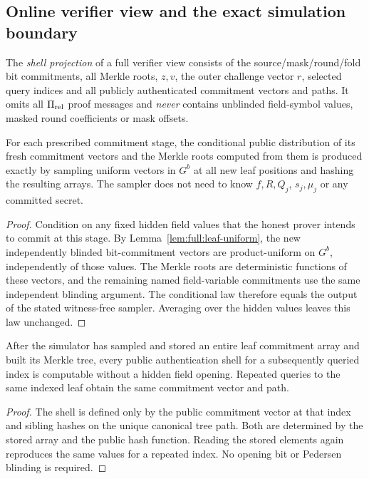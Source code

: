 \subsection{Online verifier view and the exact simulation boundary}\label{sec:full:online}

\begin{definition}\label{def:full:shell-view}
The \emph{shell projection} of a full
verifier view consists of the
source/mask/round/fold bit commitments,
all Merkle roots, $z,v$, the outer
challenge vector $r$, selected query
indices and all publicly authenticated
commitment vectors and paths.
It omits all $\Pi_{\rm rel}$ proof
messages and \emph{never} contains
unblinded field-symbol values,
masked round coefficients or
mask offsets.
\end{definition}

\begin{lemma}\label{lem:full:simulate-roots}
For each prescribed commitment stage,
the conditional public distribution
of its fresh commitment vectors
and the Merkle roots computed from
them is produced exactly by sampling
uniform vectors in $G^b$ at all
new leaf positions and hashing
the resulting arrays. The sampler
does not need to know $f,R,Q_j$,
$s_j,\mu_j$ or any committed secret.
\end{lemma}
\begin{proof}
Condition on any fixed hidden
field values that the honest
prover intends to commit at
this stage. By
Lemma~\ref{lem:full:leaf-uniform},
the new independently blinded
bit-commitment vectors are
product-uniform on $G^b$,
independently of those values.
The Merkle roots are deterministic
functions of these vectors, and
the remaining named field-variable
commitments use the same
independent blinding argument.
The conditional law therefore
equals the output of the stated
witness-free sampler.
Averaging over the hidden values
leaves this law unchanged.
\end{proof}

\begin{lemma}\label{lem:full:path-determined}
After the simulator has sampled
and stored an entire leaf
commitment array and built
its Merkle tree, every public
authentication shell for a
subsequently queried index is
computable without a hidden
field opening. Repeated queries
to the same indexed leaf obtain
the same commitment vector and
path.
\end{lemma}
\begin{proof}
The shell is defined only by
the public commitment vector
at that index and sibling hashes
on the unique canonical tree
path. Both are determined by
the stored array and the public
hash function. Reading the
stored elements again reproduces
the same values for a repeated
index. No opening bit or
Pedersen blinding is required.
\end{proof}

